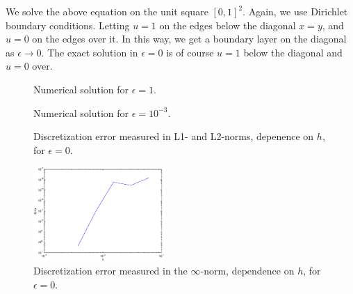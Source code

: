 \documentclass[a4paper,10pt]{article}
\begin{document}
We solve the above equation on the unit square $[0,1]^2$. Again, we use Dirichlet boundary
conditions. Letting $u=1$ on the edges below the diagonal $x=y$, and $u=0$ on the edges
over it. In this way, we get a boundary layer on the diagonal as $\epsilon\to0$. The exact
solution in $\epsilon=0$ is of course $u=1$ below the diagonal and $u=0$ over.

\begin{figure}[!ht]
\centering
{}
\caption{Numerical solution for $\epsilon=1$.}
\end{figure}

\begin{figure}[!ht]
\centering
{}
\caption{Numerical solution for $\epsilon=10^{-3}$.}
\end{figure}

\begin{figure}[!ht]
\centering
{}
\caption{Discretization error measured in L1- and L2-norms, depenence on $h$, for $\epsilon=0$.}
\end{figure}

\begin{figure}[!ht]
\centering
\includegraphics[width=5cm]{e2_linferr_vs_h.eps}
\caption{Discretization error measured in the $\infty$-norm, dependence on $h$, for $\epsilon=0$.}
\end{figure}
\end{document}
